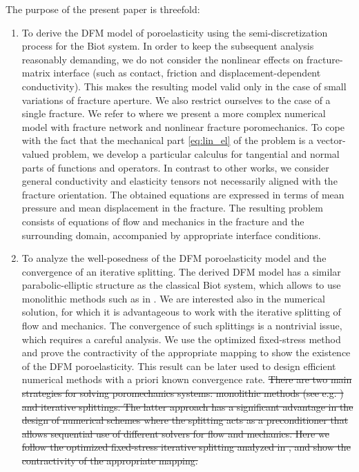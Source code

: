 \documentclass[a4paper]{article}
\numberwithin{equation}{section}
\def\js#1{{\color{blue}#1}}
\begin{document}
The purpose of the present paper is threefold:
\begin{enumerate}
    \item To derive the DFM model of poroelasticity using the semi-discretization process for the Biot system.
    \js{In order to keep the subsequent analysis reasonably demanding, we do not consider the nonlinear effects on fracture-matrix interface (such as contact, friction and displacement-dependent conductivity). This makes the resulting model valid only in the case of small variations of fracture aperture. We also restrict ourselves to the case of a single fracture. We refer to \cite{stebel_ugn} where we present a more complex numerical model with fracture network and nonlinear fracture poromechanics.}
    To cope with the fact that the mechanical part \eqref{eq:lin_el} of the problem is a vector-valued problem, we develop a particular calculus for tangential and normal parts of functions and operators.
    In contrast to other works, we consider general conductivity and elasticity tensors not necessarily aligned with the fracture orientation.
    The obtained equations are expressed in terms of mean pressure and mean displacement in the fracture.
    The resulting problem consists of equations of flow and mechanics in the fracture and the surrounding domain, accompanied by appropriate interface conditions.

    \item To analyze the well-posedness of the DFM poroelasticity model \js{and the convergence of an iterative splitting}.
    \js{The derived DFM model has a similar parabolic-elliptic structure as the classical Biot system, which allows to use monolithic methods such as in \cite{showalter2000diffusion,zenisek1984existence}. We are interested also in the numerical solution, for which it is advantageous to work with the iterative splitting of flow and mechanics. The convergence of such splittings is a nontrivial issue, which requires a careful analysis. We use the optimized fixed-stress method \cite{mikelic2013convergence} and prove the contractivity of the appropriate mapping to show the existence of the DFM poroelasticity. This result can be later used to design efficient numerical methods with a priori known convergence rate.}
    \js{\sout{There are two main strategies for solving poromechanics systems: monolithic methods (see e.g.
    ) and iterative splittings.
    The latter approach has a significant advantage in the design of numerical schemes where the splitting acts as a preconditioner
    that allows sequential use of different solvers for flow and mechanics.
    Here we follow the optimized fixed-stress iterative splitting analyzed in
    , and show the contractivity of the appropriate mapping\js.%
    }}


\end{enumerate}
\end{document}
